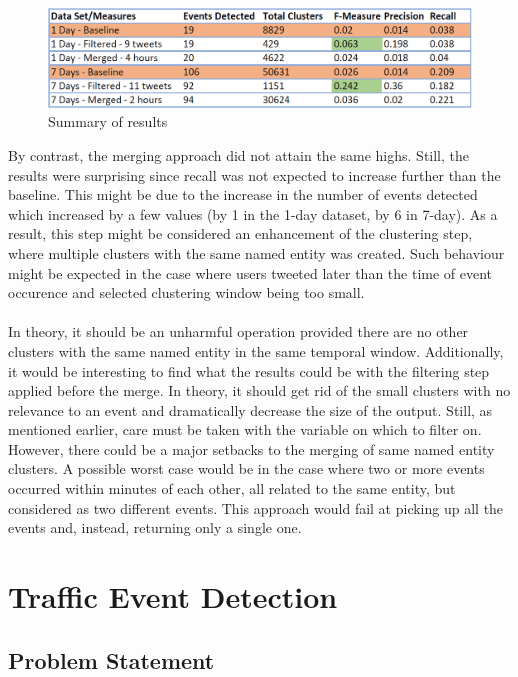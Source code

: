 \documentclass[a4paper,portrait,12pt]{article}
\begin{document}
\begin{figure}[h!]
	\centering
	\includegraphics[width=\linewidth]{images/summary.png}
	\caption{Summary of results}
	\label{fig:summary}
\end{figure}

By contrast, the merging approach did not attain the same highs.
Still, the results were surprising since recall was not expected to increase further than the baseline.
This might be due to the increase in the number of events detected which increased by a few values (by 1 in the 1-day dataset, by 6 in 7-day).
As a result, this step might be considered an enhancement of the clustering step, where multiple clusters with the same named entity was created. 
Such behaviour might be expected in the case where users tweeted later than the time of event occurence and selected clustering window being too small.
\\\\
In theory, it should be an unharmful operation provided there are no other clusters with the same named entity in the same temporal window.
Additionally, it would be interesting to find what the results could be with the filtering step applied before the merge.
In theory, it should get rid of the small clusters with no relevance to an event and dramatically decrease the size of the output. 
Still, as mentioned earlier, care must be taken with the variable on which to filter on.
\\
However, there could be a major setbacks to the merging of same named entity clusters.
A possible worst case would be in the case where two or more events occurred within minutes of each other, all related to the same entity, but considered as two different events. 
This approach would fail at picking up all the events and, instead, returning only a single one. 

\section{Traffic Event Detection}
\subsection{Problem Statement}
\end{document}
